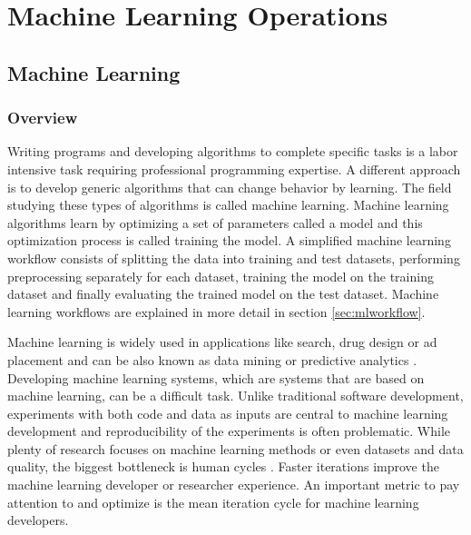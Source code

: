 \chapter{Machine Learning Operations}


\section{Machine Learning} %
\label{sec:ml}

\subsection{Overview}

Writing programs and developing algorithms to complete specific tasks is a labor intensive task requiring professional programming expertise.
A different approach is to develop generic algorithms that can change behavior by learning.
The field studying these types of algorithms is called machine learning.
Machine learning algorithms learn by optimizing a set of parameters called a model and this optimization process is called training the model. %
A simplified machine learning workflow consists of splitting the data into training and test datasets, performing preprocessing separately for each dataset, training the model on the training dataset and finally evaluating the trained model on the test dataset.  %
Machine learning workflows are explained in more detail in section \ref{sec:mlworkflow}.

Machine learning is widely used in applications like search, drug design or ad placement and can be also known as data mining or predictive analytics \parencite{domingosFewUsefulThings2012}. Developing machine learning systems, which are systems that are based on machine learning, can be a difficult task. Unlike traditional software development, experiments with both code and data as inputs are central to machine learning development \parencite{zahariaAcceleratingMachineLearning2018} and reproducibility of the experiments is often problematic. While plenty of research focuses on machine learning methods or even datasets and data quality, the biggest bottleneck is human cycles \parencite{domingosFewUsefulThings2012}. Faster iterations improve the machine learning developer or researcher experience. An important metric to pay attention to and optimize is the mean iteration cycle for machine learning developers.

